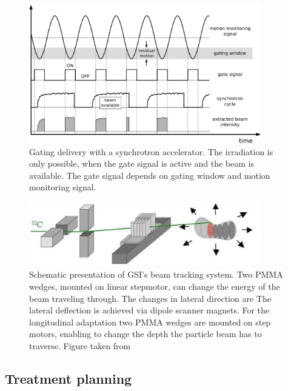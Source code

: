 \documentclass[type=dr, dr=rernat, accentcolor=tud7b,colorbacktitle, bigchapter, openright, twoside, 12pt ]{tudthesis}
\begin{document}
\begin{figure}[tbp]
  \centering
  \includegraphics[width=0.9\textwidth]{./Images/gatingscheme}
  \caption{Gating delivery with a synchrotron accelerator. The irradiation is only possible, when the gate signal is active and the beam is available. The gate signal
  depends on gating window and motion monitoring signal.}
  \label{gating}
\end{figure}

\begin{figure}[H]
\begin{center}
\includegraphics[width=0.9\textwidth]{./Images/tracking.png}
\caption{Schematic presentation of GSI's beam tracking system. Two PMMA wedges, mounted on linear stepmotor, can change the energy of the beam traveling through. The changes in lateral direction are 
The lateral deflection is achieved via dipole scanner magnets. For the longitudinal adaptation two 
PMMA wedges are mounted on step motors, enabling to change the depth the particle beam has to traverse. Figure taken from \cite{Groezinger2004}}
\label{tracking}
\end{center}
\end{figure}

\subsection{Treatment planning}
\label{treatmentPlanning}
\end{document}
